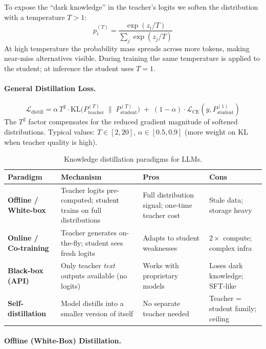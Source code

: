 To expose the ``dark knowledge'' in the teacher’s logits we soften the distribution with a temperature $T > 1$: 
\[
p_i^{(T)} = \frac{\exp(z_i / T)}{\sum_j \exp(z_j / T)}
\]
 At high temperature the probability mass spreads across more tokens, making near-miss alternatives visible. During training the same temperature is applied to the student; at inference the student uses $T=1$.

\paragraph{General Distillation Loss.}
\label{general-distillation-loss.}

\[
\mathcal{L}_{\text{distill}} = \alpha \, T^2 \cdot \text{KL}\!\bigl(P_{\text{teacher}}^{(T)} \;\|\; P_{\text{student}}^{(T)}\bigr) \;+\; (1-\alpha) \cdot \mathcal{L}_{\text{CE}}(y, P_{\text{student}}^{(1)})
\]
 The $T^2$ factor compensates for the reduced gradient magnitude of softened distributions. Typical values: $T \in [2, 20]$, $\alpha \in [0.5, 0.9]$ (more weight on KL when teacher quality is high).

\begin{table}[ht!]
\centering
\caption{Knowledge distillation paradigms for LLMs.}
\begin{tabular}{@{}lp{3.5cm}p{3.5cm}p{4cm}@{}}
\toprule
\textbf{Paradigm} & \textbf{Mechanism} & \textbf{Pros} & \textbf{Cons} \\
\midrule
\textbf{Offline / White-box} & Teacher logits pre-computed; student trains on full distributions & Full distribution signal; one-time teacher cost & Stale data; storage heavy \\
\textbf{Online / Co-training} & Teacher generates on-the-fly; student sees fresh logits & Adapts to student weaknesses & $2\times$ compute; complex infra \\
\textbf{Black-box (API)} & Only teacher \emph{text} outputs available (no logits) & Works with proprietary models & Loses dark knowledge; SFT-like \\
\textbf{Self-distillation} & Model distills into a smaller version of itself & No separate teacher needed & Teacher = student family; ceiling \\
\bottomrule
\end{tabular}
\end{table}

\paragraph{Offline (White-Box) Distillation.}
\label{offline-white-box-distillation.}

